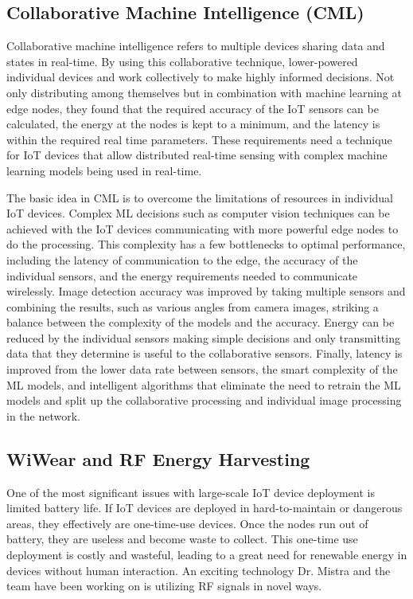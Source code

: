 \documentclass[journal,onecolumn]{IEEEtran}
\begin{document}
\subsection{Collaborative Machine Intelligence (CML)}

Collaborative machine intelligence refers to multiple devices sharing data and states in real-time. By using this collaborative technique, lower-powered individual devices and work collectively to make highly informed decisions. Not only distributing among themselves but in combination with machine learning at edge nodes, they found that the required accuracy of the IoT sensors can be calculated, the energy at the nodes is kept to a minimum, and the latency is within the required real time parameters. These requirements need a technique for IoT devices that allow distributed real-time sensing with complex machine learning models being used in real-time. 

The basic idea in CML is to overcome the limitations of resources in individual IoT devices. Complex ML decisions such as computer vision techniques can be achieved with the IoT devices communicating with more powerful edge nodes to do the processing. This complexity has a few bottlenecks to optimal performance, including the latency of communication to the edge, the accuracy of the individual sensors, and the energy requirements needed to communicate wirelessly. Image detection accuracy was improved by taking multiple sensors and combining the results, such as various angles from camera images, striking a balance between the complexity of the models and the accuracy. Energy can be reduced by the individual sensors making simple decisions and only transmitting data that they determine is useful to the collaborative sensors. Finally, latency is improved from the lower data rate between sensors, the smart complexity of the ML models, and intelligent algorithms that eliminate the need to retrain the ML models and split up the collaborative processing and individual image processing in the network. 

\subsection{WiWear and RF Energy Harvesting}

One of the most significant issues with large-scale IoT device deployment is limited battery life. If IoT devices are deployed in hard-to-maintain or dangerous areas, they effectively are one-time-use devices. Once the nodes run out of battery, they are useless and become waste to collect. This one-time use deployment is costly and wasteful, leading to a great need for renewable energy in devices without human interaction. An exciting technology Dr. Mistra and the team have been working on is utilizing RF signals in novel ways.
\end{document}
